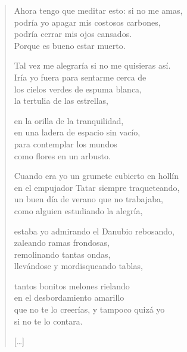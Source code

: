 \documentclass[11pt]{book}
\newcommand*{\centeredornament}{\centerline{\pgfornament[width=6cm]{88}}}
\begin{document}
\newpage

\vspace*{-15mm}
\centeredornament



\begin{verse}
  Ahora tengo que meditar esto: si no me amas,\hspace*{-1mm} \\
  podría yo apagar mis costosos carbones, \\
  podría cerrar mis ojos cansados. \\
  Porque es bueno estar muerto.

  Tal vez me alegraría si no me quisieras así. \\
  Iría yo fuera para sentarme cerca de \\
  los cielos verdes de espuma blanca, \\
  la tertulia de las estrellas,

  en la orilla de la tranquilidad, \\
  en una ladera de espacio sin vacío, \\
  para contemplar los mundos \\
  como flores en un arbusto.

  Cuando era yo un grumete cubierto en hollín \\
  en el empujador Tatar siempre traqueteando,\hspace*{-1mm} \\
  un buen día de verano que no trabajaba, \\
  como alguien estudiando la alegría,

  estaba yo admirando el Danubio rebosando, \\
  zaleando ramas frondosas, \\
  remolinando tantas ondas, \\
  llevándose y mordisqueando tablas,

  tantos bonitos melones rielando \\
  en el desbordamiento amarillo \\
  que no te lo creerías, y tampoco quizá yo \\
  si no te lo contara.

  \hfill [\ldots]
\end{verse}

\newpage

\vspace*{-15mm}
\centeredornament
\end{document}
